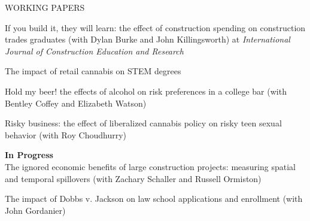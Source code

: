 \documentclass{resume}
\begin{document}
\begin{rSection}{WORKING PAPERS} 

{If you build it, they will learn: the effect of construction spending on construction trades graduates} (with Dylan Burke and John Killingsworth) at \textit{International Journal of Construction Education and Research} 

{The impact of retail cannabis on STEM degrees} 

{Hold my beer! the effects of alcohol on risk preferences in a college bar} (with Bentley Coffey and Elizabeth Watson) %

{Risky business: the effect of liberalized cannabis policy on risky teen sexual behavior} (with Roy Choudhurry) %

\hspace{-2ex}\textbf{In Progress}\\
{The ignored economic benefits of large construction projects: measuring spatial and temporal spillovers} (with Zachary Schaller and Russell Ormiston)

{The impact of Dobbs v. Jackson on law school applications and enrollment} (with John Gordanier)











\end{rSection}
\end{document}
